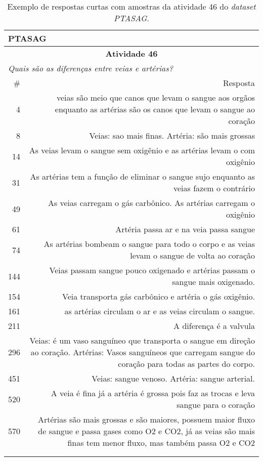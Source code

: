 \begin{table}
\centering
\caption{Exemplo de respostas curtas com amostras da atividade 46 do \textit{dataset PTASAG}.}
\label{tab-ptasag46-exemplo}
\begin{tabular}{ r | r}
\hline
\multicolumn{2}{l}{\textbf{PTASAG}} \\ \hline
\multicolumn{2}{c}{\textbf{Atividade 46}} \\ \hline 
\multicolumn{2}{l}{\textit{Quais são as diferenças entre veias e artérias?}} \\ \hline
 \# & Resposta \\ \hline
 4 & veias são meio que canos que levam o sangue aos orgãos enquanto as artérias são os canos que levam o sangue ao coração \\
 8 & Veias: sao mais finas. Artéria: são mais grossas \\
 14 & As veias levam o sangue sem oxigênio e as artérias levam o com oxigênio \\
 31 & As artérias tem a função de eliminar o sangue sujo enquanto as veias fazem o contrário \\
 49 & As veias carregam o gás carbônico. As artérias carregam o oxigênio \\
 61 & Artéria passa ar e na veia passa sangue \\
 74  & As artérias bombeam o sangue para todo o corpo e as veias levam o sangue de volta ao coração \\
 144 & Veias passam sangue pouco oxigenado e artérias passam o sangue mais oxigenado. \\
 154 & Veia transporta gás carbônico e artéria o gás oxigênio. \\
 161 & as artérias circulam o ar e as veias circulam o sangue. \\
 211 & A diferença é a valvula \\
 296 & Veias: é um vaso sanguíneo que transporta o sangue em direção ao coração. Artérias: Vasos sanguíneos que carregam sangue do coração para todas as partes do corpo. \\
 451 & Veias: sangue venoso. Artéria: sangue arterial. \\
 520 & A veia é fina já a artéria é grossa pois faz as trocas e leva sangue para o coração \\ 
 570 &  Artérias são mais grossas e são maiores, possuem maior fluxo de sangue e passa gases como O2 e CO2, já as veias são mais finas tem menor fluxo, mas também passa O2 e CO2 \\
\\
\\
\hline
\hline
\end{tabular}
\end{table}


